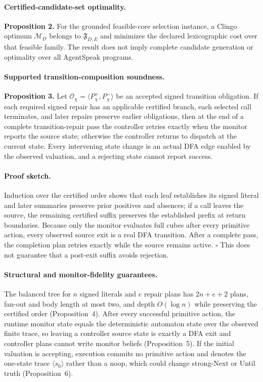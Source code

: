 \paragraph{Certified-candidate-set optimality.}

\textbf{Proposition 2.} For the grounded feasible-core selection instance, a
Clingo optimum $\mathcal M_D$ belongs to $\mathfrak F_{D,E}$ and minimizes the
declared lexicographic cost over that feasible family. The result does not imply
complete candidate generation or optimality over all AgentSpeak programs.

\paragraph{Supported transition-composition soundness.}

\textbf{Proposition 3.} Let $\mathcal O_\chi=\langle
P_\chi^+,P_\chi^-\rangle$ be an accepted signed transition obligation. If each
required signed repair has an applicable certified branch,
each selected call terminates, and later repairs preserve earlier obligations,
then at the end of a complete transition-repair pass the controller retries
exactly when the monitor reports the source state; otherwise the controller returns to
dispatch at the
current state. Every intervening state change is an actual DFA edge enabled by
the observed valuation, and a rejecting state cannot report success.

\paragraph{Proof sketch.}
Induction over the certified order shows that each leaf
establishes its signed literal and later summaries preserve prior positives and
absences; if a call leaves the source, the remaining certified suffix preserves
the established prefix at return boundaries. Because only the monitor evaluates full cubes
after every primitive action, every observed source exit is a real DFA
transition. After a complete pass, the completion plan retries exactly while the source
remains active. \hfill$\square$ This does not guarantee that a post-exit suffix
avoids rejection.

\paragraph{Structural and monitor-fidelity guarantees.}
The balanced tree for $n$ signed literals and $e$ repair plans has
$2n+e+2$ plans, fan-out and body length at most two, and depth $O(\log n)$
while preserving the certified order (Proposition~4). After every successful
primitive action, the runtime monitor state equals the deterministic automaton
state over the observed finite trace, so leaving a controller source state is
exactly a DFA exit and controller plans cannot write monitor beliefs
(Proposition~5). If the initial valuation is accepting, execution
commits no primitive action and denotes the one-state trace
$\langle s_0\rangle$ rather than a noop, which could change
strong-Next or Until truth (Proposition~6).
